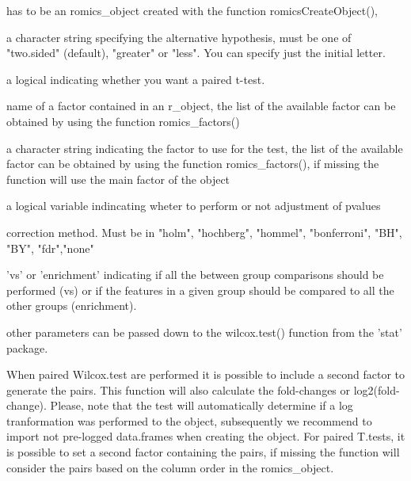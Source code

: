 \documentclass[a4paper]{book}
\begin{document}
\begin{Arguments}
\begin{ldescription}
\item[\code{romics\_object}] has to be an romics\_object created with the function romicsCreateObject(),

\item[\code{alternative}] a character string specifying the alternative hypothesis, must be one of "two.sided" (default), "greater" or "less". You can specify just the initial letter.

\item[\code{paired}] a logical indicating whether you want a paired t-test.

\item[\code{pairing\_factor}] name of a factor contained in an r\_object, the list of the available factor can be obtained by using the function romics\_factors()

\item[\code{factor}] a character string indicating the factor to use for the test, the list of the available factor can be obtained by using the function romics\_factors(), if missing the function will use the main factor of the object

\item[\code{padj}] a logical variable indincating wheter to perform or not adjustment of pvalues

\item[\code{padj\_method}] correction method. Must be in  "holm", "hochberg", "hommel", "bonferroni", "BH", "BY", "fdr","none"

\item[\code{mode}] 'vs' or 'enrichment' indicating if all the between group comparisons should be performed (vs) or if the features in a given group should be compared to all the other groups (enrichment).

\item[\code{...}] other parameters can be passed down to the wilcox.test() function from the 'stat' package.
\end{ldescription}
\end{Arguments}
%
\begin{Details}
When paired Wilcox.test are performed it is possible to include a second factor to generate the pairs. This function will also calculate the fold-changes or log2(fold-change). Please, note that the test will automatically determine if a log tranformation was performed to the object, subsequently we recommend to import not pre-logged data.frames when creating the object. For paired T.tests, it is possible to set a second factor containing the pairs, if missing the function will consider the pairs based on the column order in the romics\_object.
\end{Details}
\end{document}
